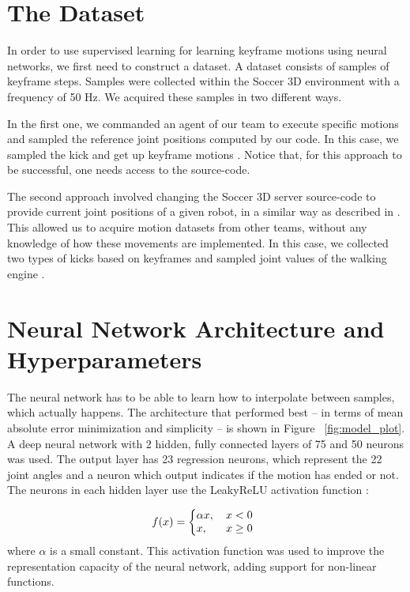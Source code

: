 \section{The Dataset}\label{AA}
In order to use supervised learning for learning keyframe motions using neural networks, we first need to construct a dataset. A dataset consists of samples of keyframe steps. Samples were collected within the Soccer 3D environment with a frequency of 50 Hz. We acquired these samples in two different ways.

In the first one, we commanded an agent of our team to execute specific motions and sampled the reference joint positions computed by our code. In this case, we sampled the kick and get up keyframe motions \cite{muniz2016}. Notice that, for this approach to be successful, one needs access to the source-code.

The second approach involved changing the Soccer 3D server source-code to provide current joint positions of a given robot, in a similar way as described in \cite{macalpine2013}. This allowed us to acquire motion datasets from other teams, without any knowledge of how these movements are implemented. In this case, we collected two types of kicks based on keyframes and sampled joint values of the walking engine \cite{AAAI12-MacAlpine}.


\section{Neural Network Architecture and Hyperparameters}

The neural network has to be able to learn how to interpolate between samples, which actually happens. The architecture that performed best -- in terms of mean absolute error minimization and simplicity -- is shown in Figure ~\ref{fig:model_plot}. A deep neural network with 2 hidden, fully connected layers of 75 and 50 neurons was used. The output layer has 23 regression neurons, which represent the 22 joint angles and a neuron which output indicates if the motion has ended or not. The neurons in each hidden layer use the LeakyReLU activation function \cite{leakyrelu}: 

\[
  f(x) = \left\{
     \begin{array}{@{}l@{\thinspace}l}
       \alpha x,   & \quad x < 0  \\
       x, & \quad x \ge0 \\
     \end{array}
   \right.
\]
where $\alpha$ is a small constant. This activation function was used to improve the representation capacity of the neural network, adding support for non-linear functions.

